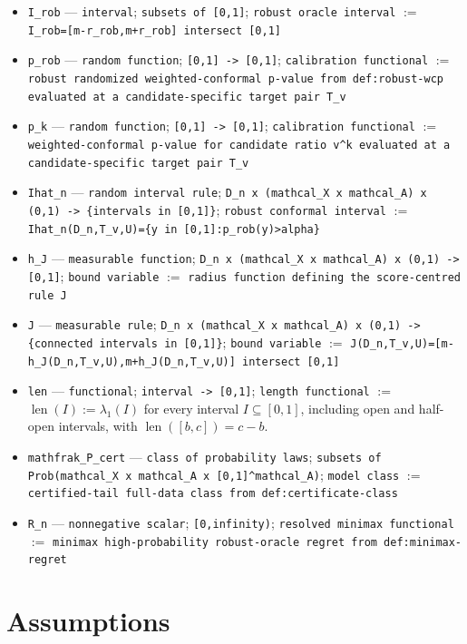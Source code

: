 \documentclass{article}
\begin{document}
\begin{itemize}
  \item \texttt{I\_rob} --- \texttt{interval}; \texttt{subsets of [0,1]}; \texttt{robust oracle interval} $:=$ \texttt{I\_rob=[m-r\_rob,m+r\_rob] intersect [0,1]}
  \item \texttt{p\_rob} --- \texttt{random function}; \texttt{[0,1] -> [0,1]}; \texttt{calibration functional} $:=$ \texttt{robust randomized weighted-conformal p-value from def:robust-wcp evaluated at a candidate-specific target pair T\_v}
  \item \texttt{p\_k} --- \texttt{random function}; \texttt{[0,1] -> [0,1]}; \texttt{calibration functional} $:=$ \texttt{weighted-conformal p-value for candidate ratio v\textasciicircum{}k evaluated at a candidate-specific target pair T\_v}
  \item \texttt{Ihat\_n} --- \texttt{random interval rule}; \texttt{D\_n x (mathcal\_X x mathcal\_A) x (0,1) -> \{intervals in [0,1]\}}; \texttt{robust conformal interval} $:=$ \texttt{Ihat\_n(D\_n,T\_v,U)=\{y in [0,1]:p\_rob(y)>alpha\}}
  \item \texttt{h\_J} --- \texttt{measurable function}; \texttt{D\_n x (mathcal\_X x mathcal\_A) x (0,1) -> [0,1]}; \texttt{bound variable} $:=$ \texttt{radius function defining the score-centred rule J}
  \item \texttt{J} --- \texttt{measurable rule}; \texttt{D\_n x (mathcal\_X x mathcal\_A) x (0,1) -> \{connected intervals in [0,1]\}}; \texttt{bound variable} $:=$ \texttt{J(D\_n,T\_v,U)=[m-h\_J(D\_n,T\_v,U),m+h\_J(D\_n,T\_v,U)] intersect [0,1]}
  \item \texttt{len} --- \texttt{functional}; \texttt{interval -> [0,1]}; \texttt{length functional} $:=$ \(\operatorname{len}(I):=\lambda_1(I)\) for every interval \(I\subseteq[0,1]\), including open and half-open intervals, with \(\operatorname{len}([b,c])=c-b\).
  \item \texttt{mathfrak\_P\_cert} --- \texttt{class of probability laws}; \texttt{subsets of Prob(mathcal\_X x mathcal\_A x [0,1]\textasciicircum{}mathcal\_A)}; \texttt{model class} $:=$ \texttt{certified-tail full-data class from def:certificate-class}
  \item \texttt{R\_n} --- \texttt{nonnegative scalar}; \texttt{[0,infinity)}; \texttt{resolved minimax functional} $:=$ \texttt{minimax high-probability robust-oracle regret from def:minimax-regret}
\end{itemize}

\section{Assumptions}
\end{document}
